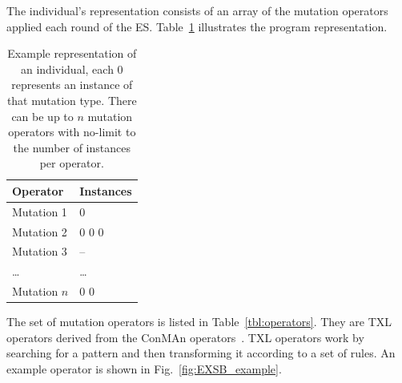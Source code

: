\documentclass{llncs}
\begin{document}
The individual's representation consists of an array of the mutation operators
applied each round of the ES. Table~\ref{tbl:individual_representation}
illustrates the program representation.

\begin{table}[!h]
\begin{center}
\caption{Example representation of an individual, each 0 represents an instance
of that mutation type. There can be up to $n$ mutation operators with no-limit
to the number of instances per operator.}
\begin{tabular}{|l|l|}
\hline
\textbf{Operator} & \textbf{Instances}\\
\hline
Mutation 1 & 0\\
\hline
Mutation 2 & 0 0 0\\
\hline
Mutation 3 & --\\
\hline
\ldots & \ldots\\
\hline
Mutation $n$ & 0 0\\
\hline
\end{tabular}
\label{tbl:individual_representation}
\end{center}
\end{table}

The set of mutation operators is listed in Table~\ref{tbl:operators}. They are
TXL operators derived from the ConMAn operators~\cite{BCD06}. TXL operators
work by searching for a pattern and then transforming it according to a set of
rules. An example operator is shown in Fig.~\ref{fig:EXSB_example}.
\end{document}
